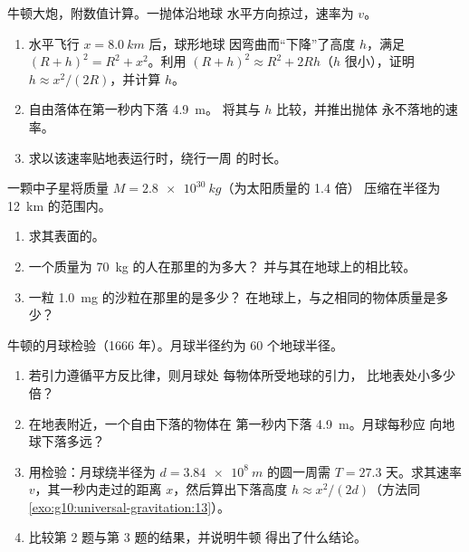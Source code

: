 \begin{exercise}[$\star\star\star$]\label{exo:g10:universal-gravitation:13}
牛顿大炮，附数值计算。一抛体沿地球
水平方向掠过，速率为 $v$。
\begin{enumerate}
  \item 水平飞行 $x = \qty{8.0}{km}$ 后，球形地球
        因弯曲而“下降”了高度 $h$，满足
        $(R + h)^2 = R^2 + x^2$。利用
        $(R + h)^2 \approx R^2 + 2Rh$（$h$ 很小），证明
        $h \approx x^2 / (2R)$，并计算 $h$。
  \item 自由落体在第一秒内下落 \qty{4.9}{m}。
        将其与 $h$ 比较，并推出抛体
        永不落地的速率。
  \item 求以该速率贴地表运行时，绕行一周
        的时长。
\end{enumerate}
\end{exercise}

\begin{exercise}[$\star\star\star$]\label{exo:g10:universal-gravitation:14}
一颗中子星将质量 $M = \qty{2.8e30}{kg}$（为太阳质量的 1.4 倍）
压缩在半径为 \qty{12}{km} 的范围内。
\begin{enumerate}
  \item 求其表面的。
  \item 一个质量为 \qty{70}{kg} 的人在那里的为多大？
        并与其在地球上的相比较。
  \item 一粒 \qty{1.0}{mg} 的沙粒在那里的是多少？
        在地球上，与之相同的物体质量是多少？
\end{enumerate}
\end{exercise}

\begin{exercise}[$\star\star\star$]\label{exo:g10:universal-gravitation:15}
牛顿的月球检验（1666 年）。月球半径约为
$60$ 个地球半径。
\begin{enumerate}
  \item 若引力遵循平方反比律，则月球处
        每物体所受地球的引力，
        比地表处小多少倍？
  \item 在地表附近，一个自由下落的物体在
        第一秒内下落 \qty{4.9}{m}。月球每秒应
        向地球下落多远？
  \item 用检验：月球绕半径为
        $d = \qty{3.84e8}{m}$ 的圆一周需 $T = 27.3$ 天。求其速率
        $v$，其一秒内走过的距离 $x$，然后算出下落高度
        $h \approx x^2/(2d)$（方法同
        \cref{exo:g10:universal-gravitation:13}）。
  \item 比较第 2 题与第 3 题的结果，并说明牛顿
        得出了什么结论。
\end{enumerate}
\end{exercise}

